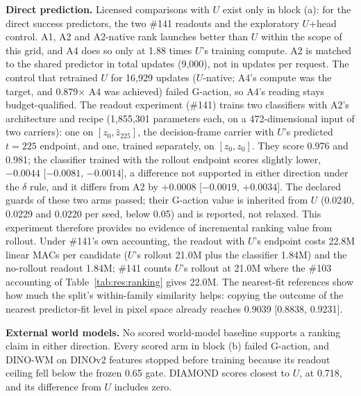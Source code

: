 \begin{revblock}
\textbf{Direct prediction.} Licensed comparisons with $U$ exist only in block (a): for the direct success predictors, the two \#141 readouts and the exploratory $U$+head control. A1, A2 and A2-native rank launches better than $U$ within the scope of this grid, and A4 does so only at 1.88 times $U$'s training compute. A2 is matched to the shared predictor in total updates (9,000), not in updates per request. The control that retrained $U$ for 16,929 updates ($U$-native; A4's compute was the target, and 0.879$\times$ A4 was achieved) failed G-action, so A4's reading stays budget-qualified. The readout experiment (\#141) trains two classifiers with A2's architecture and recipe (1,855,301 parameters each, on a 472-dimensional input of two carriers): one on $[z_0,\hat z_{225}]$, the decision-frame carrier with $U$'s predicted $t=225$ endpoint, and one, trained separately, on $[z_0,z_0]$. They score 0.976 and 0.981; the classifier trained with the rollout endpoint scores slightly lower, $-0.0044$ [$-0.0081$, $-0.0014$], a difference not supported in either direction under the $\delta$ rule, and it differs from A2 by $+0.0008$ [$-0.0019$, $+0.0034$]. The declared guards of these two arms passed; their G-action value is inherited from $U$ (0.0240, 0.0229 and 0.0220 per seed, below 0.05) and is reported, not relaxed. This experiment therefore provides no evidence of incremental ranking value from rollout. Under \#141's own accounting, the readout with $U$'s endpoint costs 22.8M linear MACs per candidate ($U$'s rollout 21.0M plus the classifier 1.84M) and the no-rollout readout 1.84M; \#141 counts $U$'s rollout at 21.0M where the \#103 accounting of Table~\ref{tab:res:ranking} gives 22.0M. The nearest-fit references show how much the split's within-family similarity helps: copying the outcome of the nearest predictor-fit level in pixel space already reaches 0.9039 [0.8838, 0.9231].

\textbf{External world models.} No scored world-model baseline supports a ranking claim in either direction. Every scored arm in block (b) failed G-action, and DINO-WM on DINOv2 features stopped before training because its readout ceiling fell below the frozen 0.65 gate. DIAMOND scores closest to $U$, at 0.718, and its difference from $U$ includes zero.


\end{revblock}
